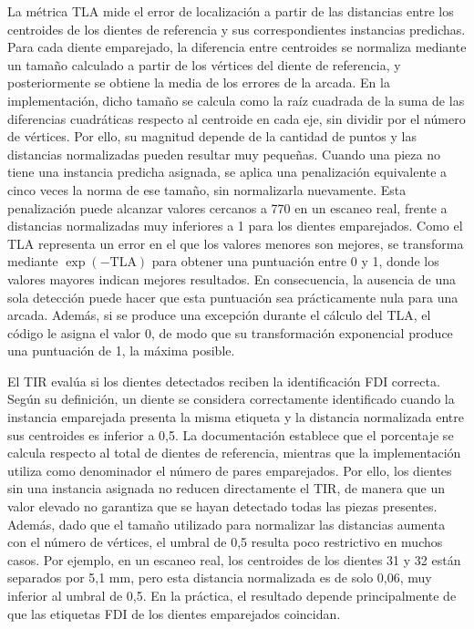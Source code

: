 La métrica TLA mide el error de localización a partir de las distancias entre los centroides de los dientes de referencia y sus correspondientes instancias predichas. Para cada diente emparejado, la diferencia entre centroides se normaliza mediante un tamaño calculado a partir de los vértices del diente de referencia, y posteriormente se obtiene la media de los errores de la arcada. En la implementación, dicho tamaño se calcula como la raíz cuadrada de la suma de las diferencias cuadráticas respecto al centroide en cada eje, sin dividir por el número de vértices. Por ello, su magnitud depende de la cantidad de puntos y las distancias normalizadas pueden resultar muy pequeñas. Cuando una pieza no tiene una instancia predicha asignada, se aplica una penalización equivalente a cinco veces la norma de ese tamaño, sin normalizarla nuevamente. Esta penalización puede alcanzar valores cercanos a 770 en un escaneo real, frente a distancias normalizadas muy inferiores a 1 para los dientes emparejados. Como el TLA representa un error en el que los valores menores son mejores, se transforma mediante $\exp(-\mathrm{TLA})$ para obtener una puntuación entre 0 y 1, donde los valores mayores indican mejores resultados. En consecuencia, la ausencia de una sola detección puede hacer que esta puntuación sea prácticamente nula para una arcada. Además, si se produce una excepción durante el cálculo del TLA, el código le asigna el valor 0, de modo que su transformación exponencial produce una puntuación de 1, la máxima posible.

El TIR evalúa si los dientes detectados reciben la identificación FDI correcta. Según su definición, un diente se considera correctamente identificado cuando la instancia emparejada presenta la misma etiqueta y la distancia normalizada entre sus centroides es inferior a 0{,}5. La documentación establece que el porcentaje se calcula respecto al total de dientes de referencia, mientras que la implementación utiliza como denominador el número de pares emparejados. Por ello, los dientes sin una instancia asignada no reducen directamente el TIR, de manera que un valor elevado no garantiza que se hayan detectado todas las piezas presentes. Además, dado que el tamaño utilizado para normalizar las distancias aumenta con el número de vértices, el umbral de 0{,}5 resulta poco restrictivo en muchos casos. Por ejemplo, en un escaneo real, los centroides de los dientes 31 y 32 están separados por 5{,}1 mm, pero esta distancia normalizada es de solo 0{,}06, muy inferior al umbral de 0{,}5. En la práctica, el resultado depende principalmente de que las etiquetas FDI de los dientes emparejados coincidan.

